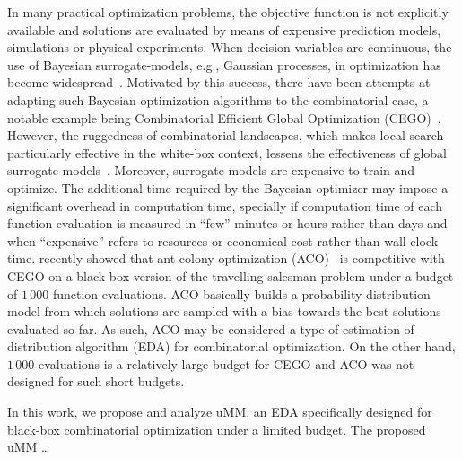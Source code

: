 \documentclass[runningheads]{llncs}
\begin{document}
In many practical optimization problems, the objective function is not
explicitly available and solutions are evaluated by means of expensive
prediction models, simulations or physical experiments. When decision variables
are continuous, the use of Bayesian surrogate-models, e.g., Gaussian processes,
in optimization has become
widespread~\citep{JonSchWel98go,ForKea2009surrogate}. Motivated by this
success, there have been attempts at adapting such Bayesian optimization
algorithms to the combinatorial case, a notable example being Combinatorial
Efficient Global Optimization
(CEGO)~\citep{ZaeStoBar2014:ppsn,ZaeStoFriFisNauBar2014}. However, the
ruggedness of combinatorial landscapes, which makes local search particularly
effective in the white-box context, lessens the effectiveness of global
surrogate models~\citep{EriPeaGar2019scalable}. Moreover, surrogate models are
expensive to train and optimize. The additional time required by the Bayesian
optimizer may impose a significant overhead in computation time, specially if
computation time of each function evaluation is measured in ``few'' minutes or
hours rather than days and when ``expensive'' refers to resources or economical
cost rather than wall-clock time. \citet{PerLopStu2015si} recently showed that
ant colony optimization (ACO)~\citep{DorStu2004:book} is competitive with CEGO
on a black-box version of the travelling salesman problem under a budget of
$1\,000$ function evaluations. ACO basically builds a probability distribution
model from which solutions are sampled with a bias towards the best solutions
evaluated so far. As such, ACO may be considered a type of
estimation-of-distribution algorithm (EDA) for combinatorial optimization. On
the other hand, $1\,000$ evaluations is a relatively large budget for CEGO and
ACO was not designed for such short budgets.

In this work, we propose and analyze uMM, an EDA specifically designed for
black-box combinatorial optimization under a limited budget. The proposed uMM 
\ldots{}
\end{document}

